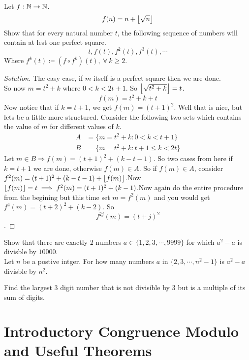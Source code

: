 \documentclass{scrartcl} %
\begin{document}
\begin{example}[CMI B4, 2017] 
Let $f : \mathbb N \rightarrow \mathbb N$.
\[ f(n) = n + \left\lfloor \sqrt{n} \right\rfloor\]
Show that for every natural number $t$, the following sequence of numbers will contain at lest one perfect square.
\[
	t, f(t), f^2(t),f^3(t),\cdots
\]
Where $f^k(t) \coloneq \left(f \circ f^k\right)(t), \ \forall\ k\geq2$.
\end{example}
\begin{proof}[Solution]
The easy case, if $m$ itself is a perfect square then we are done.\\
So now $m = t^2 + k$ where $0 < k < 2t + 1$. So $\left\lfloor \sqrt{t^2+k} \right\rfloor = t$.
\[
	f(m) = t^2 + k + t
\]
Now notice that if $k = t + 1$, we get $f(m) = \left(t+1\right)^2$. Well that is nice, but lets be a little more structured.
Consider the following two sets which contains the value of $m$ for different values of $k$.
\begin{align*}
	A &= \{m = t^2 + k : 0 < k < t + 1\}\\
	B &= \{m = t^2 + k : t + 1 \leq k < 2t\}
\end{align*}
Let $m \in B \Rightarrow f(m) = (t + 1)^2 + (k - t - 1)$. So two cases from here if $k = t+1$ we are done, otherwise $f(m) \in A$. So if $f(m) \in A$, consider $f^2(m) = (t+1)^2 + (k - t - 1) + \left\lfloor f(m) \right\rfloor$.Now $\left\lfloor f(m) \right\rfloor = t \implies f^2(m) = (t+1)^2 + (k - 1)$.Now again do the entire procedure from the begining but this time set $m = f^2(m)$ and you would get $f^4(m) = (t + 2)^2 + (k - 2)$. So\[ f^{2j}(m) = (t + j)^2\].
\end{proof}
\begin{example}[CMI B3, 2015]
	Show that there are exactly 2 numbers $a \in \{1,2,3,\cdots, 9999\}$ for which $a^2 - a$ is divisble by $10000$.\\
		Let $n$ be a postive intger. For how many numbers $a$ in $\{2,3,\cdots, n^2-1\}$ is $a^2 - a$ divisble by $n^2$.
\end{example}
\begin{example}
Find the largest 3 digit number that is not divisible by 3 but is a multiple of its sum of digits.
\end{example}
\newpage


\newpage
\section{Introductory Congruence Modulo and Useful Theorems}
\end{document}
